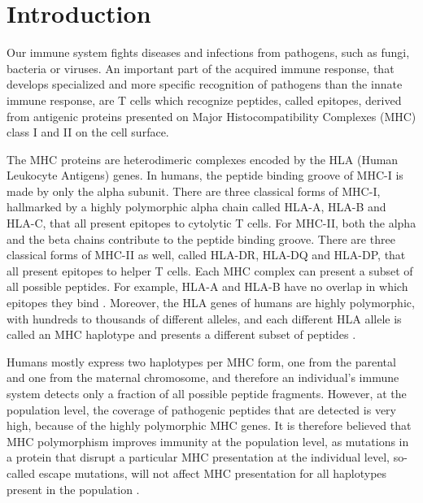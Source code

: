 \section{Introduction}


Our immune system fights diseases and infections from pathogens, 
such as fungi, bacteria or viruses. 
An important part of the acquired immune response, 
that develops specialized and more specific recognition of pathogens 
than the innate immune response, 
are T cells which recognize peptides, called epitopes, derived from antigenic proteins presented on Major Histocompatibility Complexes (MHC) class I and II on the cell surface. 


The MHC proteins are heterodimeric complexes encoded by the
HLA (Human Leukocyte Antigens) genes.
In humans, the peptide binding groove of MHC-I is made by only the alpha subunit. There are three classical forms of MHC-I, hallmarked by a highly polymorphic alpha chain called HLA-A, HLA-B and HLA-C, that all present epitopes to cytolytic T cells. 
For MHC-II, both the alpha and the beta chains contribute to the peptide binding groove. There are three classical forms of MHC-II as well, called HLA-DR, HLA-DQ and HLA-DP, that all present epitopes to helper T cells.
Each MHC complex can present a subset of all possible peptides.
For example, HLA-A and HLA-B have no overlap in which
epitopes they bind \cite{lund2004definition}.
Moreover, the HLA genes of humans are highly polymorphic, with hundreds 
to thousands of different alleles, 
and each different HLA allele is called 
an MHC haplotype and presents a different subset of peptides \cite{marsh2010nomenclature}.


Humans mostly express two haplotypes per MHC form, one from the parental and one from the maternal chromosome, 
and therefore an individual's immune system detects 
only a fraction of all possible peptide fragments. 
However, at the population level, the coverage of pathogenic peptides that are detected 
is very high, because of the highly polymorphic MHC genes.
It is therefore believed that MHC polymorphism improves immunity at the population level, 
as mutations in a protein that disrupt a particular MHC presentation at the individual level, 
so-called escape mutations, 
will not affect MHC presentation for all haplotypes present in the population \cite{sommer2005importance}.

